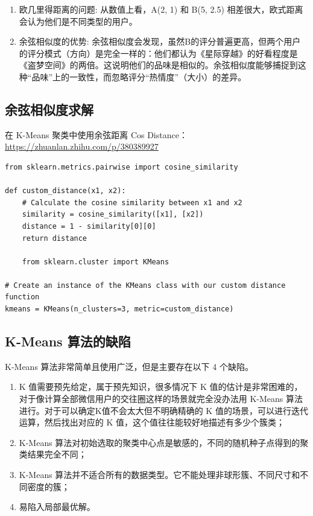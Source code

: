 \begin{solution}
    \begin{enumerate}
        \item 欧几里得距离的问题: 从数值上看，A(2, 1) 和 B(5, 2.5) 相差很大，欧式距离会认为他们是不同类型的用户。
        \item 余弦相似度的优势: 余弦相似度会发现，虽然B的评分普遍更高，但两个用户的评分模式（方向）是完全一样的：他们都认为《星际穿越》的好看程度是《盗梦空间》的两倍。这说明他们的品味是相似的。余弦相似度能够捕捉到这种“品味”上的一致性，而忽略评分“热情度”（大小）的差异。
    \end{enumerate}
\end{solution}

\subsection{余弦相似度求解}

在 K-Means 聚类中使用余弦距离 Cos Distance：\href{https://zhuanlan.zhihu.com/p/380389927}{https://zhuanlan.zhihu.com/p/380389927}

\begin{lstlisting}[style=python]
from sklearn.metrics.pairwise import cosine_similarity

def custom_distance(x1, x2):
    # Calculate the cosine similarity between x1 and x2
    similarity = cosine_similarity([x1], [x2])
    distance = 1 - similarity[0][0]
    return distance

    from sklearn.cluster import KMeans

# Create an instance of the KMeans class with our custom distance function
kmeans = KMeans(n_clusters=3, metric=custom_distance)
\end{lstlisting}

\subsection{K-Means 算法的缺陷}

K-Means 算法非常简单且使用广泛，但是主要存在以下 4 个缺陷。
\begin{enumerate}
    \item K 值需要预先给定，属于预先知识，很多情况下 K 值的估计是非常困难的，对于像计算全部微信用户的交往圈这样的场景就完全没办法用 K-Means 算法进行。对于可以确定K值不会太大但不明确精确的 K 值的场景，可以进行迭代运算，然后找出对应的 K 值，这个值往往能较好地描述有多少个簇类；
    \item K-Means 算法对初始选取的聚类中心点是敏感的，不同的随机种子点得到的聚类结果完全不同；
    \item K-Means 算法并不适合所有的数据类型。它不能处理非球形簇、不同尺寸和不同密度的簇；
    \item 易陷入局部最优解。
\end{enumerate}

